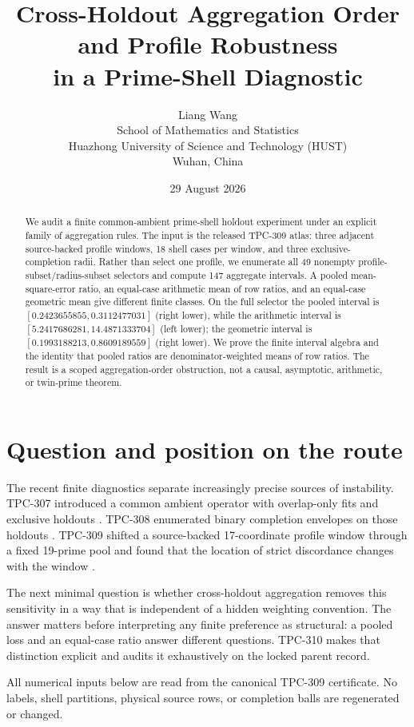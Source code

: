 \documentclass[10pt,a4paper]{article}
\title{Cross-Holdout Aggregation Order and Profile Robustness\\
       in a Prime-Shell Diagnostic}
\author{Liang Wang\\
School of Mathematics and Statistics\\
Huazhong University of Science and Technology (HUST)\\
Wuhan, China}
\date{29 August 2026}
\begin{document}
\maketitle

\begin{abstract}
We audit a finite common-ambient prime-shell holdout experiment under an
explicit family of aggregation rules.  The input is the released TPC-309 atlas:
three adjacent source-backed profile windows, 18 shell cases per window, and
three exclusive-completion radii.  Rather than select one profile, we enumerate
all 49 nonempty profile-subset/radius-subset selectors and compute 147 aggregate
intervals.  A pooled mean-square-error ratio, an equal-case arithmetic mean of
row ratios, and an equal-case geometric mean give different finite classes.  On
the full selector the pooled interval is
\([0.2423655855,0.3112477031]\) (right lower), while the arithmetic interval is
\([5.2417686281,14.4871333704]\) (left lower); the geometric interval is
\([0.1993188213,0.8609189559]\) (right lower).  We prove the finite interval
algebra and the identity that pooled ratios are denominator-weighted means of
row ratios.  The result is a scoped aggregation-order obstruction, not a causal,
asymptotic, arithmetic, or twin-prime theorem.
\end{abstract}

\section{Question and position on the route}

The recent finite diagnostics separate increasingly precise sources of
instability.  TPC-307 introduced a common ambient operator with overlap-only
fits and exclusive holdouts \cite{tpc307}.  TPC-308 enumerated binary completion
envelopes on those holdouts \cite{tpc308}.  TPC-309 shifted a source-backed
17-coordinate profile window through a fixed 19-prime pool and found that the
location of strict discordance changes with the window \cite{tpc309}.

The next minimal question is whether cross-holdout aggregation removes this
sensitivity in a way that is independent of a hidden weighting convention.  The
answer matters before interpreting any finite preference as structural: a
pooled loss and an equal-case ratio answer different questions.  TPC-310 makes
that distinction explicit and audits it exhaustively on the locked parent
record.

All numerical inputs below are read from the canonical TPC-309 certificate.
No labels, shell partitions, physical source rows, or completion balls are
regenerated or changed.
\end{document}
